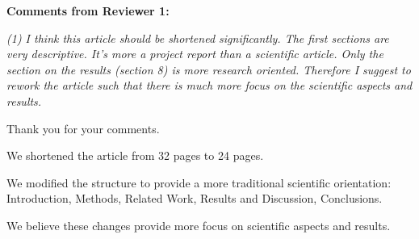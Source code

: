 \documentclass[12pt]{letter}
\begin{document}
\begin{letter}{}

{\bf Comments from Reviewer 1:}

{\em (1) I think this article should be shortened significantly. The first sections are very descriptive. It's more a project report than a scientific article. Only the section on the results (section 8) is more research oriented. Therefore I suggest to rework the article such that there is much more focus on the scientific aspects and results.}

Thank you for your comments.

We shortened the article from 32 pages to 24 pages.

We modified the structure to provide a more traditional scientific orientation: Introduction, Methods, Related Work, Results and Discussion, Conclusions.

We believe these changes provide more focus on scientific aspects and results.


\end{letter}
\end{document}
